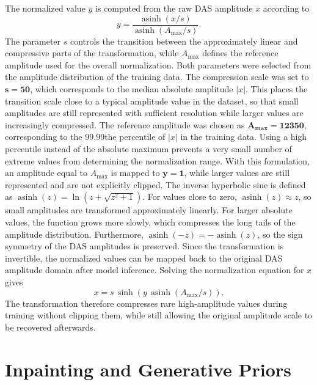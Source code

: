\documentclass[english,ba]{tudo-sse-thesis}
\begin{document}
The normalized value \(y\) is computed from the raw DAS amplitude \(x\)
according to
\begin{equation}
    y
    =
    \frac{
        \operatorname{asinh}(x/s)
    }{
        \operatorname{asinh}(A_{\max}/s)
    }.
\end{equation}
The parameter \(s\) controls the transition between the approximately
linear and compressive parts of the transformation, while \(A_{\max}\)
defines the reference amplitude used for the overall normalization.
Both parameters were selected from the amplitude distribution of the
training data. The compression scale was set to \(\boldsymbol{s=50}\), which corresponds to the median absolute amplitude \(|x|\). This places the transition scale close to a typical amplitude value in the dataset, so that small amplitudes are still represented with sufficient resolution while larger values are increasingly compressed.
The reference amplitude was chosen as \(\boldsymbol{A_{\max}=12350}\), corresponding to the \(99.99\)the percentile of \(|x|\) in the training data. Using a high percentile instead of the absolute maximum prevents a very small number of extreme values from determining the normalization range. With this formulation, an amplitude equal to \(A_{\max}\) is mapped to \(\boldsymbol{y=1}\), while larger values are still represented and are not explicitly clipped.
The inverse hyperbolic sine is defined as
\(\operatorname{asinh}(z)=\ln\left(z+\sqrt{z^2+1}\right)\).
For values close to zero, \(\operatorname{asinh}(z)\approx z\), so small amplitudes are transformed approximately linearly. For larger absolute values, the function grows more slowly, which compresses the long tails of the amplitude distribution. Furthermore, \(\operatorname{asinh}(-z)=-\operatorname{asinh}(z)\), so the sign symmetry of the DAS amplitudes is preserved.
Since the transformation is invertible, the normalized values can be
mapped back to the original DAS amplitude domain after model inference.
Solving the normalization equation for \(x\) gives
\begin{equation}
    x =
    s\,
    \sinh
    \left(
        y\,
        \operatorname{asinh}(A_{\max}/s)
    \right).
\end{equation}
The transformation therefore compresses rare high-amplitude values
during training without clipping them, while still allowing the original
amplitude scale to be recovered afterwards.

\section{Inpainting and Generative Priors}
\end{document}
